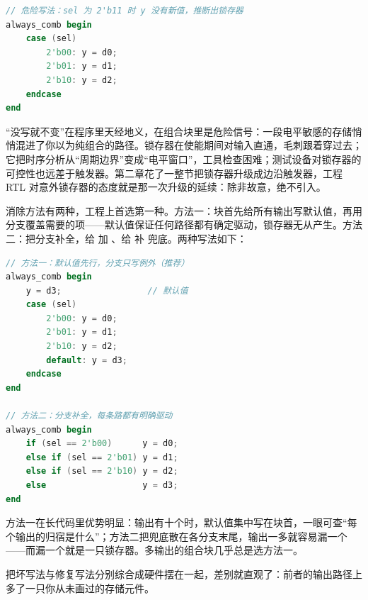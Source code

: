 \begin{lstlisting}[language=Verilog]
// 危险写法：sel 为 2'b11 时 y 没有新值，推断出锁存器
always_comb begin
    case (sel)
        2'b00: y = d0;
        2'b01: y = d1;
        2'b10: y = d2;
    endcase
end
\end{lstlisting}

“没写就不变”在程序里天经地义，在组合块里是危险信号：一段电平敏感的存储悄悄混进了你以为纯组合的路径。锁存器在使能期间对输入直通，毛刺跟着穿过去；它把时序分析从“周期边界”变成“电平窗口”，工具检查困难；测试设备对锁存器的可控性也远差于触发器。第二章花了一整节把锁存器升级成边沿触发器，工程 RTL 对意外锁存器的态度就是那一次升级的延续：除非故意，绝不引入。

消除方法有两种，工程上首选第一种。方法一：块首先给所有输出写默认值，再用分支覆盖需要的项——默认值保证任何路径都有确定驱动，锁存器无从产生。方法二：把分支补全，给  加 、给  补  兜底。两种写法如下：

\begin{lstlisting}[language=Verilog]
// 方法一：默认值先行，分支只写例外（推荐）
always_comb begin
    y = d3;                 // 默认值
    case (sel)
        2'b00: y = d0;
        2'b01: y = d1;
        2'b10: y = d2;
        default: y = d3;
    endcase
end

// 方法二：分支补全，每条路都有明确驱动
always_comb begin
    if (sel == 2'b00)      y = d0;
    else if (sel == 2'b01) y = d1;
    else if (sel == 2'b10) y = d2;
    else                   y = d3;
end
\end{lstlisting}

方法一在长代码里优势明显：输出有十个时，默认值集中写在块首，一眼可查“每个输出的归宿是什么”；方法二把兜底散在各分支末尾，输出一多就容易漏一个——而漏一个就是一只锁存器。多输出的组合块几乎总是选方法一。

把坏写法与修复写法分别综合成硬件摆在一起，差别就直观了：前者的输出路径上多了一只你从未画过的存储元件。

